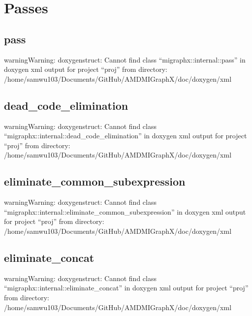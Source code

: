 \documentclass[letterpaper,10pt,english]{sphinxmanual}
\begin{document}
\section{Passes}
\label{\detokenize{dev/pass:passes}}\label{\detokenize{dev/pass::doc}}

\subsection{pass}
\label{\detokenize{dev/pass:pass}}
\begin{sphinxadmonition}{warning}{Warning:}
\sphinxAtStartPar
doxygenstruct: Cannot find class “migraphx::internal::pass” in doxygen xml output for project “proj” from directory: /home/samwu103/Documents/GitHub/AMDMIGraphX/doc/doxygen/xml
\end{sphinxadmonition}


\subsection{dead\_code\_elimination}
\label{\detokenize{dev/pass:dead-code-elimination}}
\begin{sphinxadmonition}{warning}{Warning:}
\sphinxAtStartPar
doxygenstruct: Cannot find class “migraphx::internal::dead\_code\_elimination” in doxygen xml output for project “proj” from directory: /home/samwu103/Documents/GitHub/AMDMIGraphX/doc/doxygen/xml
\end{sphinxadmonition}


\subsection{eliminate\_common\_subexpression}
\label{\detokenize{dev/pass:eliminate-common-subexpression}}
\begin{sphinxadmonition}{warning}{Warning:}
\sphinxAtStartPar
doxygenstruct: Cannot find class “migraphx::internal::eliminate\_common\_subexpression” in doxygen xml output for project “proj” from directory: /home/samwu103/Documents/GitHub/AMDMIGraphX/doc/doxygen/xml
\end{sphinxadmonition}


\subsection{eliminate\_concat}
\label{\detokenize{dev/pass:eliminate-concat}}
\begin{sphinxadmonition}{warning}{Warning:}
\sphinxAtStartPar
doxygenstruct: Cannot find class “migraphx::internal::eliminate\_concat” in doxygen xml output for project “proj” from directory: /home/samwu103/Documents/GitHub/AMDMIGraphX/doc/doxygen/xml
\end{sphinxadmonition}
\end{document}
